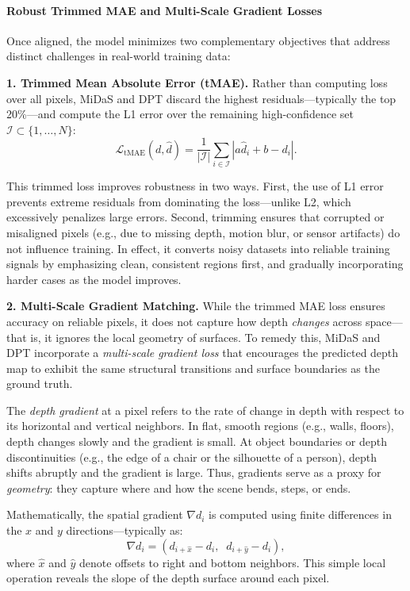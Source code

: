\paragraph{Robust Trimmed MAE and Multi-Scale Gradient Losses}

Once aligned, the model minimizes two complementary objectives that address distinct challenges in real-world training data:

\vspace{2pt}
\textbf{1. Trimmed Mean Absolute Error (tMAE).} Rather than computing loss over all pixels, MiDaS and DPT discard the highest residuals—typically the top 20\%—and compute the L1 error over the remaining high-confidence set \( \mathcal{I} \subset \{1, \dots, N\} \):
\[
\mathcal{L}_{\text{tMAE}}(d, \hat{d}) = \frac{1}{|\mathcal{I}|} \sum_{i \in \mathcal{I}} \left| a \hat{d}_i + b - d_i \right|.
\]

\newpage

This trimmed loss improves robustness in two ways. First, the use of L1 error prevents extreme residuals from dominating the loss—unlike L2, which excessively penalizes large errors. Second, trimming ensures that corrupted or misaligned pixels (e.g., due to missing depth, motion blur, or sensor artifacts) do not influence training. In effect, it converts noisy datasets into reliable training signals by emphasizing clean, consistent regions first, and gradually incorporating harder cases as the model improves.

\vspace{2pt}
\textbf{2. Multi-Scale Gradient Matching.} While the trimmed MAE loss ensures accuracy on reliable pixels, it does not capture how depth \emph{changes} across space—that is, it ignores the local geometry of surfaces. To remedy this, MiDaS and DPT incorporate a \emph{multi-scale gradient loss} that encourages the predicted depth map to exhibit the same structural transitions and surface boundaries as the ground truth.

\medskip
The \emph{depth gradient} at a pixel refers to the rate of change in depth with respect to its horizontal and vertical neighbors. In flat, smooth regions (e.g., walls, floors), depth changes slowly and the gradient is small. At object boundaries or depth discontinuities (e.g., the edge of a chair or the silhouette of a person), depth shifts abruptly and the gradient is large. Thus, gradients serve as a proxy for \emph{geometry}: they capture where and how the scene bends, steps, or ends.

Mathematically, the spatial gradient \( \nabla d_i \) is computed using finite differences in the $x$ and $y$ directions—typically as:
\[
\nabla d_i = \left( d_{i+\hat{x}} - d_i,\;\; d_{i+\hat{y}} - d_i \right),
\]
where \( \hat{x} \) and \( \hat{y} \) denote offsets to right and bottom neighbors. This simple local operation reveals the slope of the depth surface around each pixel.

